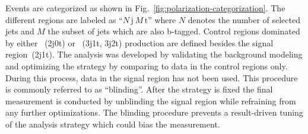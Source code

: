 Events are categorized as shown in Fig.~\ref{fig:polarization-categorization}. The different regions are labeled as ``$N\,\mathrm{j}~M\,\mathrm{t}$'' where $N$ denotes the number of selected jets and $M$ the subset of jets which are also b-tagged. Control regions dominated by either \wjets~(2j0t) or \ttbar~(3j1t, 3j2t) production are defined besides the signal region~(2j1t). The analysis was developed by validating the background modeling and optimizing the strategy by comparing to data in the control regions only. During this process, data in the signal region has not been used. This procedure is commonly referred to as ``blinding''. After the strategy is fixed the final measurement is conducted by unblinding the signal region while refraining from any further optimizations. The blinding procedure prevents a result-driven tuning of the analysis strategy which could bias the measurement.


